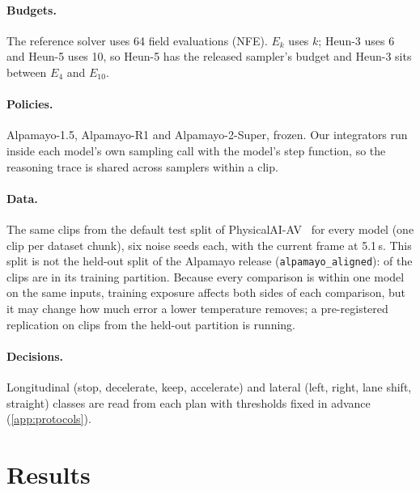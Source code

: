 \documentclass{article}
\theoremstyle{plain}
\theoremstyle{definition}
\theoremstyle{remark}
\newcommand{\TODO}[1]{\todo[inline,color=orange!25]{TODO: #1}}
\begin{document}
\paragraph{Budgets.} The reference solver uses 64 field evaluations (NFE). $E_k$ uses $k$; Heun-3 uses 6 and Heun-5 uses 10, so Heun-5 has the released sampler's budget and Heun-3 sits between $E_4$ and $E_{10}$.

\paragraph{Policies.} Alpamayo-1.5, Alpamayo-R1 and Alpamayo-2-Super, frozen. Our integrators run inside each model's own sampling call with the model's step function, so the reasoning trace is shared across samplers within a clip.
\paragraph{Data.} The same \NClips{} clips from the default test split of PhysicalAI-AV~\citep{physicalai2025} for every model (one clip per dataset chunk), six noise seeds each, with the current frame at 5.1\,s. This split is not the held-out split of the Alpamayo release (\texttt{alpamayo\_aligned}): \NClipsInTrain{} of the \NClips{} clips are in its training partition. Because every comparison is within one model on the same inputs, training exposure affects both sides of each comparison, but it may change how much error a lower temperature removes; a pre-registered replication on clips from the held-out partition is running. \TODO{held-out replication.}
\paragraph{Decisions.} Longitudinal (stop, decelerate, keep, accelerate) and lateral (left, right, lane shift, straight) classes are read from each plan with thresholds fixed in advance (\cref{app:protocols}).

\section{Results}
\label{sec:results}
\end{document}
